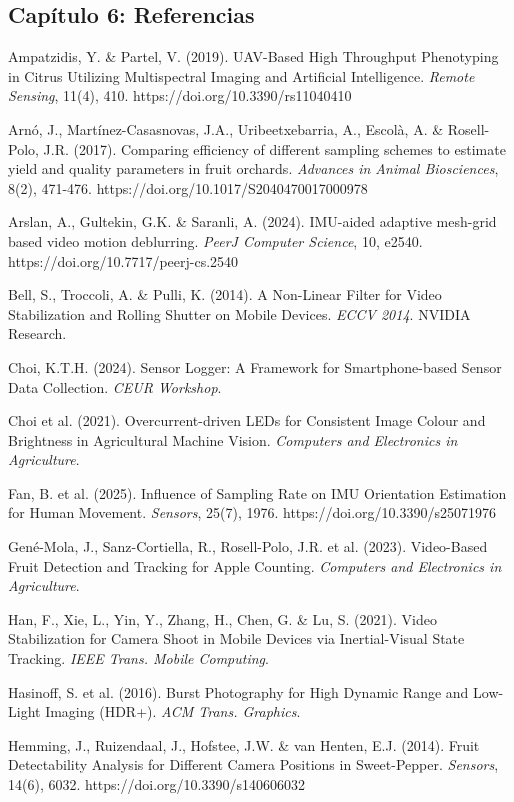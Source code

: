 \hline


\subsection{Capítulo 6: Referencias}


Ampatzidis, Y. \& Partel, V. (2019). UAV-Based High Throughput Phenotyping in Citrus Utilizing Multispectral Imaging and Artificial Intelligence. \textit{Remote Sensing}, 11(4), 410. https://doi.org/10.3390/rs11040410


Arnó, J., Martínez-Casasnovas, J.A., Uribeetxebarria, A., Escolà, A. \& Rosell-Polo, J.R. (2017). Comparing efficiency of different sampling schemes to estimate yield and quality parameters in fruit orchards. \textit{Advances in Animal Biosciences}, 8(2), 471-476. https://doi.org/10.1017/S2040470017000978


Arslan, A., Gultekin, G.K. \& Saranli, A. (2024). IMU-aided adaptive mesh-grid based video motion deblurring. \textit{PeerJ Computer Science}, 10, e2540. https://doi.org/10.7717/peerj-cs.2540


Bell, S., Troccoli, A. \& Pulli, K. (2014). A Non-Linear Filter for Video Stabilization and Rolling Shutter on Mobile Devices. \textit{ECCV 2014}. NVIDIA Research.


Choi, K.T.H. (2024). Sensor Logger: A Framework for Smartphone-based Sensor Data Collection. \textit{CEUR Workshop}.


Choi et al. (2021). Overcurrent-driven LEDs for Consistent Image Colour and Brightness in Agricultural Machine Vision. \textit{Computers and Electronics in Agriculture}.


Fan, B. et al. (2025). Influence of Sampling Rate on IMU Orientation Estimation for Human Movement. \textit{Sensors}, 25(7), 1976. https://doi.org/10.3390/s25071976


Gené-Mola, J., Sanz-Cortiella, R., Rosell-Polo, J.R. et al. (2023). Video-Based Fruit Detection and Tracking for Apple Counting. \textit{Computers and Electronics in Agriculture}.


Han, F., Xie, L., Yin, Y., Zhang, H., Chen, G. \& Lu, S. (2021). Video Stabilization for Camera Shoot in Mobile Devices via Inertial-Visual State Tracking. \textit{IEEE Trans. Mobile Computing}.


Hasinoff, S. et al. (2016). Burst Photography for High Dynamic Range and Low-Light Imaging (HDR+). \textit{ACM Trans. Graphics}.


Hemming, J., Ruizendaal, J., Hofstee, J.W. \& van Henten, E.J. (2014). Fruit Detectability Analysis for Different Camera Positions in Sweet-Pepper. \textit{Sensors}, 14(6), 6032. https://doi.org/10.3390/s140606032


